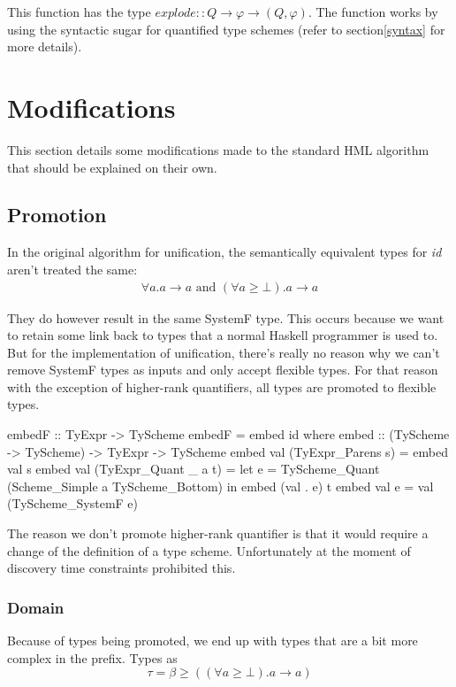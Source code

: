 This function has the type $explode :: Q \rightarrow \varphi \rightarrow (Q, \varphi)$. The function works by using the syntactic sugar for quantified type schemes (refer to section\ref{syntax} for more details).
\section{Modifications}
This section details some modifications made to the standard HML algorithm that should be explained on their own.
\subsection{Promotion}
In the original algorithm for unification, the semantically equivalent types for \emph{id} aren't treated the same:
\begin{eqnarray*}
\forall a. a \rightarrow a \textrm{ and }
(\forall a \geq \bot). a \rightarrow a
\end{eqnarray*}

They do however result in the same SystemF type. This occurs because we want to retain some link back to types that a normal Haskell programmer is used to. But for the implementation of unification, there's really no reason why we can't remove SystemF types as inputs and only accept flexible types. For that reason with the exception of higher-rank quantifiers, all types are promoted to flexible types.

\begin{code}
embedF :: TyExpr -> TyScheme
embedF = embed id
 where embed :: (TyScheme -> TyScheme) -> TyExpr -> TyScheme
       embed val (TyExpr_Parens     s) = embed val s
       embed val (TyExpr_Quant  _ a t) = 
         let e = TyScheme_Quant (Scheme_Simple a TyScheme_Bottom)
         in  embed (val . e) t
       embed val e                     = val (TyScheme_SystemF e)
\end{code}

The reason we don't promote higher-rank quantifier is that it would require a change of the definition of a type scheme. Unfortunately at the moment of discovery time constraints prohibited this.
\subsubsection{Domain}
Because of types being promoted, we end up with types that are a bit more complex in the prefix. Types as 
\begin{equation}
\tau = \beta \geq ((\forall a \geq \bot). a \rightarrow a)
\end{equation}

